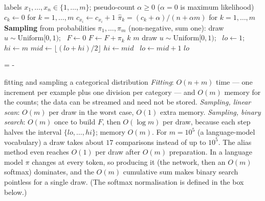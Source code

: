 \documentclass[11pt]{article}
\makeatletter
\newcommand{\keeplines}[1]{\par\penalty-100\begingroup\dimen@=#1\baselineskip\dimen@ii=\pagegoal
  \advance\dimen@ii-\pagetotal\ifdim\dimen@>\dimen@ii\ifdim\dimen@ii>\z@\vfil\fi\break\fi\endgroup}
\makeatother
\begin{document}
\begin{algorithm}[!tb]
\caption{The categorical distribution: fitting by counting; sampling by inverse c.d.f.}\label{alg:catsample}
\begin{algorithmic}[1]
\Require labels $x_1, \dots, x_n \in \{1, \dots, m\}$; pseudo-count $\alpha \ge 0$ ($\alpha = 0$ is maximum likelihood)
  \State $c_k \gets 0$ for $k = 1, \dots, m$
   $c_{x_i} \gets c_{x_i} + 1$ 
  \EndFor
  \State \Return $\hat\pi_k = (c_k + \alpha)/(n + \alpha m)$ for $k = 1, \dots, m$ 
\EndFunction
\Statex \textbf{Sampling} from probabilities $\pi_1, \dots, \pi_m$ (non-negative, sum one):
  \State draw $u \sim \mathrm{Uniform}[0, 1)$; \ $F \gets 0$ 
    \State $F \gets F + \pi_k$
     \Return $k$ \EndIf
  \EndFor
  \State \Return $m$ 
\EndFunction
{} 
  \State draw $u \sim \mathrm{Uniform}[0, 1)$; \ $lo \gets 1$; \ $hi \gets m$
   
    \State $mid \gets \lfloor (lo + hi)/2 \rfloor$
     $hi \gets mid$ \Else\ $lo \gets mid + 1$ \EndIf
  \EndWhile
  \State \Return $lo$
\EndFunction
\end{algorithmic}
\end{algorithm}

\keeplines{9}
\begin{runtime}{fitting and sampling a categorical distribution}
\emph{Fitting}: $O(n + m)$ time --- one increment per example plus one division per
category --- and $O(m)$ memory for the counts; the data can be streamed and need not be stored.
\emph{Sampling, linear scan}: $O(m)$ per draw in the worst case, $O(1)$ extra memory.
\emph{Sampling, binary search}: $O(m)$ once to build $F$, then $O(\log m)$ per draw, because each step halves the
interval $\{lo, \dots, hi\}$; memory $O(m)$. For $m = 10^5$ (a language-model vocabulary) a draw takes about $17$
comparisons instead of up to $10^5$. The alias method even reaches $O(1)$ per draw after $O(m)$ preparation.
In a language model $\pi$ changes at every token, so producing it (the network, then an $O(m)$ softmax) dominates,
and the $O(m)$ cumulative sum makes binary search pointless for a single draw. (The softmax
normalisation is defined in the box below.)
\end{runtime}
\end{document}
